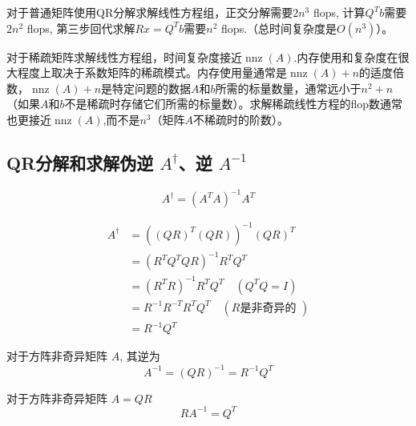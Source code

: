 对于普通矩阵使用QR分解求解线性方程组，正交分解需要$2 n^3$ flops, 计算$Q^T b$需要$2n^2$ flops, 第三步回代求解$Rx = Q^Tb$需要$n^2$ flops.（总时间复杂度是$O(n^3)$）。 

对于稀疏矩阵求解线性方程组，时间复杂度接近$\operatorname{nnz}(A)$.内存使用和复杂度在很大程度上取决于系数矩阵的稀疏模式。内存使用量通常是$\operatorname{nnz}(A)+n$的适度倍数，$\operatorname{nnz}(A)+n$是特定问题的数据$A$和$b$所需的标量数量，通常远小于$n^2+n$（如果$A$和$b$不是稀疏时存储它们所需的标量数）。求解稀疏线性方程的flop数通常也更接近$\operatorname{nnz}(A)$,而不是$n^3$（矩阵$A$不稀疏时的阶数）。


\subsection{QR分解和求解伪逆 $A^{\dagger}$、逆 $A^{-1}$}
\label{complexity:qr-solves-inverse-of-A}

\begin{definition}
    \begin{equation}A^{\dagger}=\left(A^{T} A\right)^{-1} A^{T}\end{equation}
\end{definition}

\begin{theorem}
    \begin{equation}
\begin{aligned}
A^{\dagger}&=\left((Q R)^{T}(Q R)\right)^{-1}(Q R)^{T} \\
&=\left(R^{T} Q^{T} Q R\right)^{-1} R^{T} Q^{T} \\
&=\left(R^{T} R\right)^{-1} R^{T} Q^{T} \quad\left(Q^{T} Q=I\right) \\
&=R^{-1} R^{-T} R^{T} Q^{T} \quad(R{\text {是非奇异的 }}) \\
 &={R^{-1} Q^{T}}
\end{aligned}
\end{equation}
\end{theorem}

\begin{corollary}
    对于方阵非奇异矩阵 ${A}$, 其逆为
\begin{equation}
A^{-1}=(Q R)^{-1}=R^{-1} Q^{T}
\end{equation}
\end{corollary}

\begin{corollary}
    对于方阵非奇异矩阵 ${A} = QR$
    \begin{equation}RA^{-1} = Q^T\end{equation}
\end{corollary}

